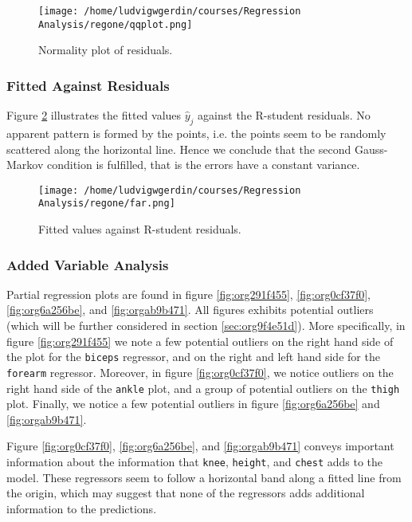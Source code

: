 \documentclass[11pt]{article}
\begin{document}
\begin{figure}[htbp]
\centering
\texttt{[image: /home/ludvigwgerdin/courses/Regression Analysis/regone/qqplot.png]}
\caption{\label{fig:orgcb81b85}
Normality plot of residuals.}
\end{figure}

\subsubsection{Fitted Against Residuals}
\label{sec:orge89323e}

Figure \ref{fig:org83c2ed0} illustrates the fitted values \(\hat y_j\) against the R-student residuals. No apparent 
pattern is formed by the points, i.e. the points seem to be randomly scattered along the horizontal line.
Hence we conclude that the second Gauss-Markov condition is fulfilled, that is the errors have a constant 
variance.

\begin{figure}[htbp]
\centering
\texttt{[image: /home/ludvigwgerdin/courses/Regression Analysis/regone/far.png]}
\caption{\label{fig:org83c2ed0}
Fitted values against R-student residuals.}
\end{figure}

\subsubsection{Added Variable Analysis}
\label{sec:org0d692ab}

Partial regression plots are found in figure \ref{fig:org291f455}, \ref{fig:org0cf37f0},
\ref{fig:org6a256be}, and \ref{fig:orgab9b471}. All figures exhibits potential outliers 
(which will be further considered in section \ref{sec:org9f4e51d}).
More specifically, in figure \ref{fig:org291f455} we note a 
few potential outliers on the right hand side of the plot for the \texttt{biceps} regressor, and on the
right and left hand side for the \texttt{forearm} regressor. Moreover, in figure \ref{fig:org0cf37f0}, we 
notice outliers on the right hand side of the \texttt{ankle} plot, and a group of potential outliers on the
\texttt{thigh} plot. Finally, we notice a few potential outliers in figure \ref{fig:org6a256be} and 
\ref{fig:orgab9b471}.

Figure \ref{fig:org0cf37f0}, \ref{fig:org6a256be}, and \ref{fig:orgab9b471} 
conveys important information about the information that \texttt{knee}, \texttt{height}, and
\texttt{chest} adds to the model. These regressors seem to follow a horizontal band along a fitted 
line from the origin, which may suggest that none of the regressors adds additional information 
to the predictions.
\end{document}
